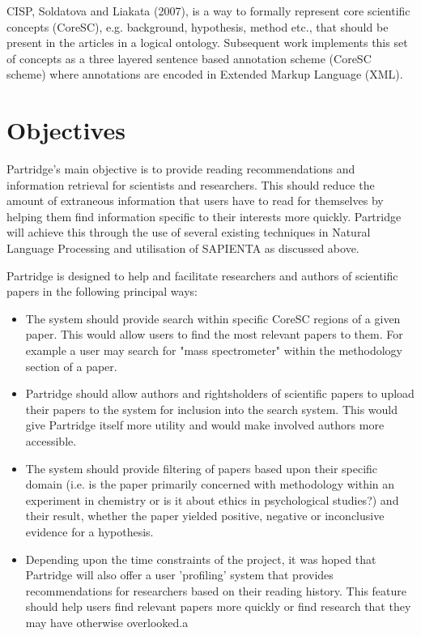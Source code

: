 CISP, Soldatova and Liakata (2007), is a way to formally represent core
scientific concepts (CoreSC), e.g. background, hypothesis, method etc., that
should be present in the articles in a logical
ontology\cite{soldatova2007ontology}. Subsequent work implements this set of
concepts as a three layered sentence based annotation scheme (CoreSC scheme)
where annotations are encoded in Extended Markup Language
(XML)\cite{LIAKATA10.644}.

\section{Objectives}

Partridge's main objective is to provide reading recommendations and
information retrieval for scientists and researchers. This should reduce the
amount of extraneous information that users have to read for themselves by
helping them find information specific to their interests more quickly.
Partridge will achieve this through the use of several existing techniques in
Natural Language Processing and utilisation of SAPIENTA as discussed above.

Partridge is designed to help and facilitate researchers and authors of
scientific papers in the following principal ways:

\begin{itemize}
\item The system should provide search within specific CoreSC regions of a given
paper. This would allow users to find the most relevant papers to them. For
example a user may search for "mass spectrometer" within the methodology
section of a paper.
\item Partridge should allow authors and rightsholders of scientific papers to
upload their papers to the system for inclusion into the search system. This
would give Partridge itself more utility and would make involved authors more
accessible.
\item The system should provide filtering of papers based upon their
specific domain (i.e. is the paper primarily concerned with methodology within
an experiment in chemistry or is it about ethics in psychological studies?) and
their result, whether the paper yielded positive, negative or inconclusive
evidence for a hypothesis. 
\item Depending upon the time constraints of the
project, it was hoped that Partridge will also offer a user 'profiling' system
that provides recommendations for researchers based on their reading history.
This feature should help users find relevant papers more quickly or find
research that they may have otherwise overlooked.a
\end{itemize}

